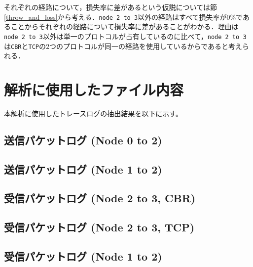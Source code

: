 \documentclass[paper=a4, fontsize=10pt]{jlreq}
\begin{document}
それぞれの経路について，損失率に差があるという仮説については節\ref{throw_and_loss}から考える．\texttt{node 2 to 3}以外の経路はすべて損失率が$0 \%$であることからそれぞれの経路について損失率に差があることがわかる．理由は\texttt{node 2 to 3}以外は単一のプロトコルが占有しているのに比べて，\texttt{node 2 to 3}は\texttt{CBR}と\texttt{TCP}の$2$つのプロトコルが同一の経路を使用しているからであると考えられる．
\appendix
\section{解析に使用したファイル内容} \label{app:files}
本解析に使用したトレースログの抽出結果を以下に示す。

\subsection{送信パケットログ (Node 0 to 2)}


\subsection{送信パケットログ (Node 1 to 2)}


\subsection{受信パケットログ (Node 2 to 3, CBR)}


\subsection{受信パケットログ (Node 2 to 3, TCP)}


\subsection{受信パケットログ (Node 1 to 2)}

\end{document}

